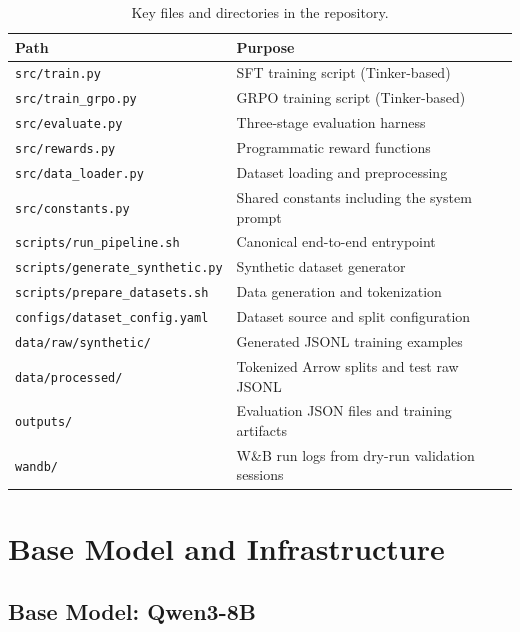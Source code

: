 \documentclass[12pt, a4paper]{article}
\newcommand{\thead}[1]{\textbf{#1}}
\begin{document}
\begin{table}[H]
\centering
\caption{Key files and directories in the repository.}
\begin{tabularx}{\linewidth}{L{6.2cm} L{8.8cm}}
\toprule
\thead{Path} & \thead{Purpose} \\
\midrule
\texttt{src/train.py} & SFT training script (Tinker-based) \\
\texttt{src/train\_grpo.py} & GRPO training script (Tinker-based) \\
\texttt{src/evaluate.py} & Three-stage evaluation harness \\
\texttt{src/rewards.py} & Programmatic reward functions \\
\texttt{src/data\_loader.py} & Dataset loading and preprocessing \\
\texttt{src/constants.py} & Shared constants including the system prompt \\
\texttt{scripts/run\_pipeline.sh} & Canonical end-to-end entrypoint \\
\texttt{scripts/generate\_synthetic.py} & Synthetic dataset generator \\
\texttt{scripts/prepare\_datasets.sh} & Data generation and tokenization \\
\texttt{configs/dataset\_config.yaml} & Dataset source and split configuration \\
\texttt{data/raw/synthetic/} & Generated JSONL training examples \\
\texttt{data/processed/} & Tokenized Arrow splits and test raw JSONL \\
\texttt{outputs/} & Evaluation JSON files and training artifacts \\
\texttt{wandb/} & W\&B run logs from dry-run validation sessions \\
\bottomrule
\end{tabularx}
\end{table}

\newpage

\section{Base Model and Infrastructure}

\subsection{Base Model: Qwen3-8B}
\end{document}
